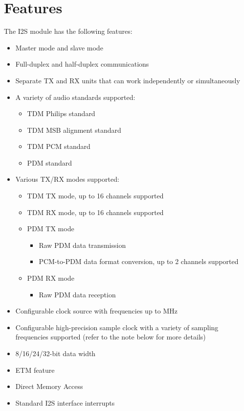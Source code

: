 \documentclass[main\_\_EN.tex]{subfiles}
\begin{document}
\section{Features}

The I2S module has the following features:

\begin{itemize}
    \item Master mode and slave mode
    \item Full-duplex and half-duplex communications
    \item Separate TX and RX units that can work independently or simultaneously
    \item A variety of audio standards supported: 
        \begin{itemize}
            \item TDM Philips standard
            \item TDM MSB alignment standard
            \item TDM PCM standard
            \item PDM standard
        \end{itemize}
        \item Various TX/RX modes supported:
        \begin{itemize}
        \item TDM TX mode, up to 16 channels supported
        \item TDM RX mode, up to 16 channels supported
        \item PDM TX mode
        \begin{itemize}
            \item Raw PDM data transmission
            \item PCM-to-PDM data format conversion, up to 2 channels supported
        \end{itemize}
        \item PDM RX mode
        \begin{itemize}
            \item Raw PDM data reception
        \end{itemize}
        \end{itemize}
    \item Configurable clock source with frequencies up to  MHz
    \item Configurable high-precision sample clock with a variety of sampling frequencies supported (refer to the note below for more details)
    \item 8/16/24/32-bit data width
    \item ETM feature
    \item Direct Memory Access
    \item Standard I2S interface interrupts 
\end{itemize}
\end{document}
